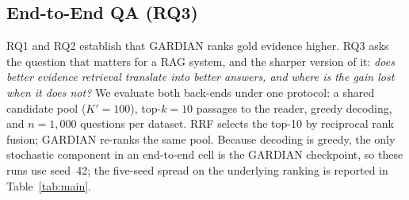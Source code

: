 %
\newcommand{\PENDING}{\textcolor{red}{??}}


\subsection{End-to-End QA (RQ3)}
\label{sec:rq3}

RQ1 and RQ2 establish that GARDIAN ranks gold evidence higher. RQ3 asks
the question that matters for a RAG system, and the sharper version of
it: \emph{does better evidence retrieval translate into better answers,
and where is the gain lost when it does not?} We evaluate both back-ends
under one protocol: a shared candidate pool ($K'{=}100$), top-$k{=}10$
passages to the reader, greedy decoding, and $n{=}1{,}000$ questions per
dataset. RRF selects the top-10 by reciprocal rank fusion; GARDIAN
re-ranks the same pool. Because decoding is greedy, the only stochastic
component in an end-to-end cell is the GARDIAN checkpoint, so these runs
use seed~42; the five-seed spread on the underlying ranking is reported
in Table~\ref{tab:main}.

